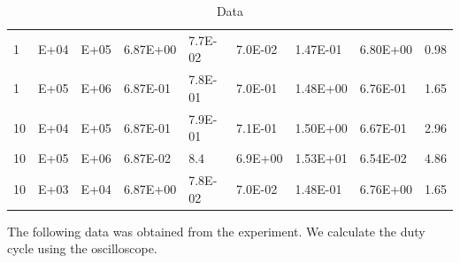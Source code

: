 \documentclass{scrartcl}
\newcommand{\1}{\mathbbm{1}}
\begin{document}
\begin{table}[H]
\begin{tabular}{|l|l|l|l|l|l|l|l|r|}
        1     & \num{E+04} & \num{E+05} & \num{6.87E+00} & \num{7.7E-02} & \num{7.0E-02} & \num{1.47E-01} & \num{6.80E+00}  & \num{0.98 }\\ 
        1     & \num{E+05} & \num{E+06} & \num{6.87E-01} & \num{7.8E-01} & \num{7.0E-01} & \num{1.48E+00} & \num{6.76E-01}  & \num{1.65 }\\ \hline
        10    & \num{E+04} & \num{E+05} & \num{6.87E-01} & \num{7.9E-01} & \num{7.1E-01} & \num{1.50E+00} & \num{6.67E-01}  & \num{2.96 }\\ 
        10    & \num{E+05} & \num{E+06} & \num{6.87E-02} & \num{8.4}     & \num{6.9E+00} & \num{1.53E+01} & \num{6.54E-02}  & \num{4.86 }\\ 
        10    & \num{E+03} & \num{E+04} & \num{6.87E+00} & \num{7.8E-02} & \num{7.0E-02} & \num{1.48E-01} & \num{6.76E+00}  & \num{1.65 }\\ \hline
    \end{tabular}
    \caption{Data}
\end{table}
The following data was obtained from the experiment. We calculate the duty cycle using the oscilloscope.
\end{document}
